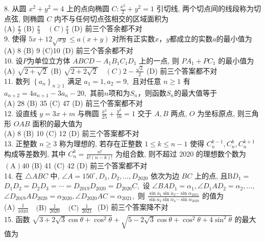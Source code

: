 8. 从圆 $x^{2}+y^{2}=4$ 上的点向椭圆 $C: \frac{x^{2}}{2}+y^{2}=1$ 引切线, 两个切点间的线段称为切点弦, 则椭圆 $C$ 内不与任何切点弦相交的区域面积为\\
(A) $\frac{\pi}{2}$
(B) $\frac{\pi}{3} \quad(C) \frac{\pi}{4}$
(D) 前三个答余都不对\\
9. 使得 $5x+12 \sqrt{xy}≤a(x+y)$ 对所有正实数$x，y$都成立的实数$a$的最小值为\\
(A) 8
(B) 9
(C)10
(D) 前三个答余都不对\\
10. 设$P$为单位立方体 $A B C D-A_{1} B_{1} C_{1} D_{1}$ 上的一点, 则 $P A_{1}+P C_{1}$ 的最小值为\\
(A) $\sqrt{2+\sqrt{2}}$
(B) $\sqrt{2+2 \sqrt{2}} \quad(C) 2-\frac{\sqrt{2}}{2}$
(D) 前三个答案都不对\\
11. 数列 $\left\{a_{n}\right\}_{n \geq 1}$ 满足 $a_{1}=1, a_{2}=9,$ 且对任意 $n \geq 1$ 有 $a_{n+2}=4 a_{n+1}-3 a_{n}-20,$ 其前$n$项和为$S_{n}$，则函数$S_{n}$的最大值等于\\
(A) 28
(B) 35
(C) 47
(D) 前三个答案都不对\\
12. 设直线 $y=3 x+m$ 与椭圆 $\frac{x^{2}}{25}+\frac{y^{2}}{16}=1$ 交于 $A, B$ 两点, $O$ 为坐标原点, 则三角形 $O A B$ 面积的最大值为\\
(A) 8
(B) 10
(C) 12
(D) 前三个答案都不对\\
13. 正整数 $n \geq 3$ 称为理想的, 若存在正整数 $1 \leq k \leq n-1$ 使得 $C_{n}^{k-1}, C_{n}^{k}, C_{n}^{k+1}$ 构成等差数列, 其中 $C_{n}^{k}=\frac{n !}{k !(n-k) !}$ 为组合数, 则不超过 2020 的理想数个数为\\
$(\mathrm{A}) 40$
(B) 41
(C) 42
(D) 前三个答案都不对\\
14. 在 $\triangle A B C$ 中, $\angle A=150^{\circ}, D_{1}, D_{2}, \ldots, D_{2020}$ 依次为边 $B C$ 上的点, 且$\mathrm B D_{1}=$
$D_{1} D_{2}=D_{2} D_{3}=\cdots=D_{2019} D_{2020}=D_{2020} C,$ 设 $\angle B A D_{1}=\alpha_{1}, \angle D_{1} A D_{2}=\alpha_{2}, \ldots,$
$\angle D_{2019} A D_{2020}=\alpha_{2020}, \angle D_{2020} A C=\alpha_{2021},$ 则 $\frac{\sin a_{1} \sin a_{3} \cdots \sin \alpha_{2021}}{\sin a_{2} \sin \alpha_{4} \cdots \sin \alpha_{2020}}$ 的值为\\
(A) $\frac{1}{1010}$
$\begin{array}{ll}\text { (B) } \frac{1}{2020} & \text { (C) } \frac{1}{2021}\end{array}$
(D) 前三个答案降不对\\
15. 函数 $\sqrt{3+2 \sqrt{3} \cos \theta+\cos ^{2} \theta}+\sqrt{5-2 \sqrt{3} \cos \theta+\cos ^{2} \theta+4 \sin ^{2} \theta}$ 的最大值为\\
